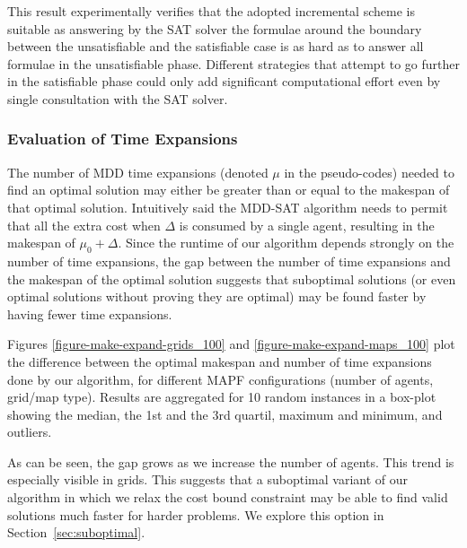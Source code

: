 \documentclass[jair,oneside,11pt]{article}
\begin{document}
This result experimentally verifies that the adopted incremental scheme is suitable as answering by the SAT solver the formulae around the boundary between the unsatisfiable and the satisfiable case is as hard as to answer all formulae in the unsatisfiable phase. Different strategies that attempt to go further in the satisfiable phase could only add significant computational effort even by single consultation with the SAT solver.


\subsubsection{Evaluation of Time Expansions}
\label{sec:expansions}

The number of MDD time expansions (denoted $\mu$ in the pseudo-codes) needed to find an optimal solution may either be greater than or equal to the makespan of that optimal solution. Intuitively said the MDD-SAT algorithm needs to permit that all the extra cost when $\Delta$ is consumed by a single agent, resulting in the makespan of $\mu_0+\Delta$. Since the runtime of our algorithm depends strongly on the number of time expansions, the gap between the number of time expansions and the makespan of the optimal solution suggests that suboptimal solutions (or even optimal solutions without proving they are optimal) may be found faster by having fewer time expansions.

Figures \ref{figure-make-expand-grids_100} and \ref{figure-make-expand-maps_100} plot the difference between the optimal makespan and number of time expansions done by our algorithm, for different MAPF configurations (number of agents, grid/map type). Results are aggregated for 10 random instances in a box-plot showing the median, the 1st and the 3rd quartil, maximum and minimum, and outliers.

As can be seen, the gap grows as we increase the number of agents. This trend is especially visible in grids. This suggests that a suboptimal variant of our algorithm in which we relax the cost bound constraint may be able to find valid solutions much faster for harder problems. We explore this option in Section~\ref{sec:suboptimal}. 
\end{document}

